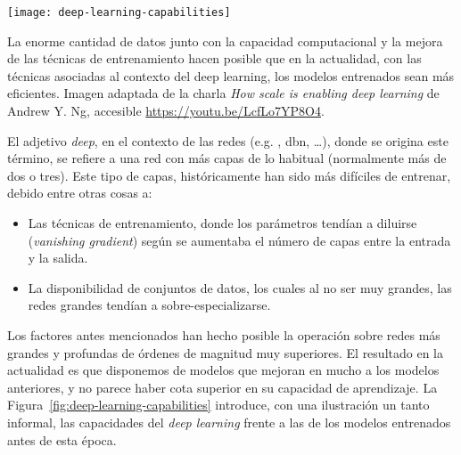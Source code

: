 \begin{marginfigure}
	\texttt{[image: deep-learning-capabilities]}
	\caption[Capacidad de los modelos en función de la cantidad de datos]{La enorme cantidad de datos junto con la capacidad computacional y la mejora de las técnicas de entrenamiento hacen posible que en la actualidad, con las técnicas asociadas al contexto del deep learning, los modelos entrenados sean más eficientes. Imagen adaptada de la charla \textit{How scale is enabling deep learning} de Andrew Y. Ng, accesible \url{https://youtu.be/LcfLo7YP8O4}.}
	\label{fig:deep-learning-capabilities}
\end{marginfigure}

El adjetivo \textit{deep}, en el contexto de las redes (e.g. , \gls{dbn}, \ldots), donde se origina este término, se refiere a una red con más capas de lo habitual (normalmente más de dos o tres). Este tipo de capas, históricamente han sido más difíciles de entrenar, debido entre otras cosas a:

\begin{itemize}
	\item Las técnicas de entrenamiento, donde los parámetros tendían a diluirse (\textit{vanishing gradient}) según se aumentaba el número de capas entre la entrada y la salida.
	\item La disponibilidad de conjuntos de datos, los cuales al no ser muy grandes, las redes grandes tendían a sobre-especializarse.
\end{itemize}

Los factores antes mencionados han hecho posible la operación sobre redes más grandes y profundas de órdenes de magnitud muy superiores. El resultado en la actualidad es que disponemos de modelos que mejoran en mucho a los modelos anteriores, y no parece haber cota superior en su capacidad de aprendizaje. La Figura~\ref{fig:deep-learning-capabilities} introduce, con una ilustración un tanto informal, las capacidades del \textit{deep learning} frente a las de los modelos entrenados antes de esta época.

\section{}

